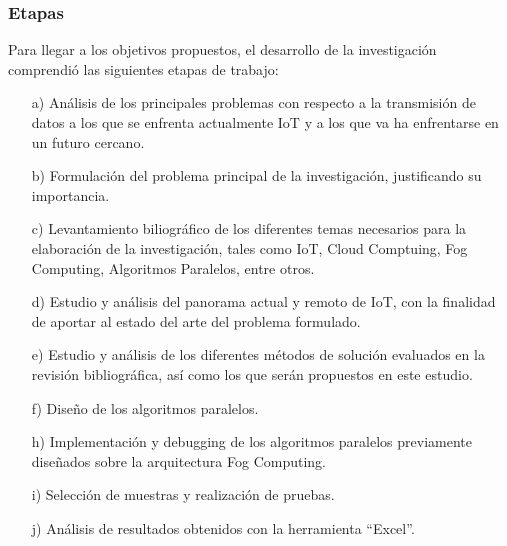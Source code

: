             \subsubsection{Etapas}
                Para llegar a los objetivos propuestos, el desarrollo de la investigación comprendió las siguientes etapas de trabajo: 
                \begin{enumerate}
                    \item[a)] Análisis de los principales problemas con respecto a la transmisión de datos a los que se enfrenta actualmente IoT y a los que va ha enfrentarse en un futuro cercano.
                    \item[b)] Formulación del problema principal de la investigación, justificando su importancia.
                    \item[c)] Levantamiento biliográfico de los diferentes temas necesarios para la elaboración de la investigación, tales como IoT, Cloud Comptuing, Fog Computing, Algoritmos Paralelos, entre otros.
                    \item[d)] Estudio y análisis del panorama actual y remoto de IoT, con la finalidad de aportar al estado del arte del problema formulado.
                    \item[e)] Estudio y análisis de los diferentes métodos de solución evaluados en la revisión bibliográfica, así como los que serán propuestos en este estudio.
                    \item[f)] Diseño de los algoritmos paralelos.
                    \item[h)] Implementación y debugging de los algoritmos paralelos previamente diseñados sobre la arquitectura Fog Computing.
                    \item[i)] Selección de muestras y realización de pruebas.
                    \item[j)] Análisis de resultados obtenidos con la herramienta ``Excel''. 
                \end{enumerate}                
